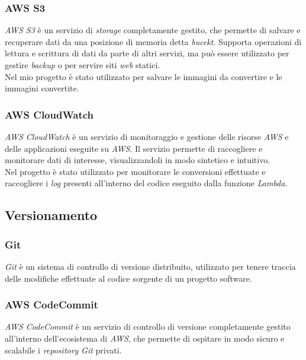 \subsubsection{AWS S3}

\emph{AWS S3} è un servizio di \emph{storage} completamente gestito, che
permette di salvare e recuperare dati da una posizione di memoria detta
\emph{bucekt}. Supporta operazioni di lettura e scrittura di dati da parte di
altri servizi, ma può essere utilizzato per gestire \emph{backup} o per servire
siti \emph{web} statici. \\
Nel mio progetto è stato utilizzato per salvare le immagini da convertire e le
immagini convertite.

\subsubsection{AWS CloudWatch}

\emph{AWS CloudWatch} è un servizio di monitoraggio e gestione delle risorse
\emph{AWS} e delle applicazioni eseguite su \emph{AWS}. Il servizio permette di
raccogliere e monitorare dati di interesse, visualizzandoli in modo sintetico e
intuitivo. \\
Nel progetto è stato utilizzato per monitorare le conversioni effettuate e
raccogliere i \emph{log} presenti all'interno del codice eseguito dalla funzione
\emph{Lambda}.

\subsection{Versionamento}

\subsubsection{Git}

\emph{Git} è un sistema di controllo di versione distribuito, utilizzato per
tenere traccia delle modifiche effettuate al codice sorgente di un progetto
\glsfirstoccur\gls{software}.

\subsubsection{AWS CodeCommit}

\emph{AWS CodeCommit} è un servizio di controllo di versione completamente
gestito all'interno dell'ecosistema di \emph{AWS}, che permette di ospitare in modo sicuro e scalabile i \emph{repository}
\emph{Git} privati. \\

